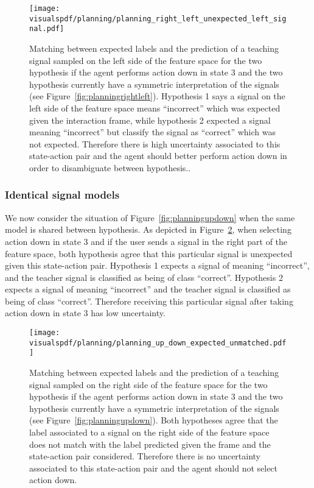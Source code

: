 \begin{figure}[H]
  \centering
  \texttt{[image: \\visualspdf/planning/planning\_right\_left\_unexpected\_left\_signal.pdf]}
  \caption{Matching between expected labels and the prediction of a teaching signal sampled on the left side of the feature space for the two hypothesis if the agent performs action down in state 3 and the two hypothesis currently have a symmetric interpretation of the signals (see Figure~\ref{fig:planningrightleft}). Hypothesis 1 says a signal on the left side of the feature space means ``incorrect'' which was expected given the interaction frame, while hypothesis 2 expected a signal meaning ``incorrect'' but classify the signal as ``correct'' which was not expected. Therefore there is high uncertainty associated to this state-action pair and the agent should better perform action down in order to disambiguate between hypothesis..}
  \label{fig:uncertaintymeaningrightleftunexpectedleft}
\end{figure}

\visuopti{\newpage}

\subsubsection*{Identical signal models}

We now consider the situation of Figure~\ref{fig:planningupdown} when the same model is shared between hypothesis. As depicted in Figure~\ref{fig:uncertaintymeaningupdownexpectedright}, when selecting action down in state 3 and if the user sends a signal in the right part of the feature space, both hypothesis agree that this particular signal is unexpected given this state-action pair. Hypothesis 1 expects a signal of meaning ``incorrect'', and the teacher signal is classified as being of class ``correct''. Hypothesis 2 expects a signal of meaning ``incorrect'' and the teacher signal is classified as being of class ``correct''. Therefore receiving this particular signal after taking action down in state 3 has low uncertainty.

\begin{figure}[H]
  \centering
  \texttt{[image: \\visualspdf/planning/planning\_up\_down\_expected\_unmatched.pdf]}
  \caption{Matching between expected labels and the prediction of a teaching signal sampled on the right side of the feature space for the two hypothesis if the agent performs action down in state 3 and the two hypothesis currently have a symmetric interpretation of the signals (see Figure~\ref{fig:planningupdown}). Both hypotheses agree that the label associated to a signal on the right side of the feature space does not match with the label predicted given the frame and the state-action pair considered. Therefore there is no uncertainty associated to this state-action pair and the agent should not select action down.}
  \label{fig:uncertaintymeaningupdownexpectedright}
\end{figure}

